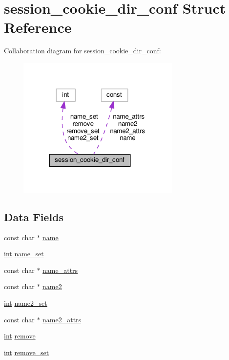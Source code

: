 \hypertarget{structsession__cookie__dir__conf}{}\section{session\+\_\+cookie\+\_\+dir\+\_\+conf Struct Reference}
\label{structsession__cookie__dir__conf}


Collaboration diagram for session\+\_\+cookie\+\_\+dir\+\_\+conf\+:
\nopagebreak
\begin{figure}[H]
\begin{center}
\leavevmode
\includegraphics[width=228pt]{structsession__cookie__dir__conf__coll__graph}
\end{center}
\end{figure}
\subsection*{Data Fields}
\begin{DoxyCompactItemize}
\item 
const char $\ast$ \hyperlink{structsession__cookie__dir__conf_aef5efea83e4d90eaf37c58b447b7d280}{name}
\item 
\hyperlink{pcre_8txt_a42dfa4ff673c82d8efe7144098fbc198}{int} \hyperlink{structsession__cookie__dir__conf_a8be97fd6ca10c8e3867d37c3bd19c94c}{name\+\_\+set}
\item 
const char $\ast$ \hyperlink{structsession__cookie__dir__conf_a655bf43384b28835b7ecd23f313cb841}{name\+\_\+attrs}
\item 
const char $\ast$ \hyperlink{structsession__cookie__dir__conf_a9bfefc815de06c1bf15e88a145e9df4c}{name2}
\item 
\hyperlink{pcre_8txt_a42dfa4ff673c82d8efe7144098fbc198}{int} \hyperlink{structsession__cookie__dir__conf_a79ea4ab086cce8641409f0836e065316}{name2\+\_\+set}
\item 
const char $\ast$ \hyperlink{structsession__cookie__dir__conf_a694bffd2a133d5bcf3cf4682678742d0}{name2\+\_\+attrs}
\item 
\hyperlink{pcre_8txt_a42dfa4ff673c82d8efe7144098fbc198}{int} \hyperlink{structsession__cookie__dir__conf_a38ce784a0c204974105024dd0d34b214}{remove}
\item 
\hyperlink{pcre_8txt_a42dfa4ff673c82d8efe7144098fbc198}{int} \hyperlink{structsession__cookie__dir__conf_ad22ff664d6c771ba1ea948c4159a66ac}{remove\+\_\+set}
\end{DoxyCompactItemize}


